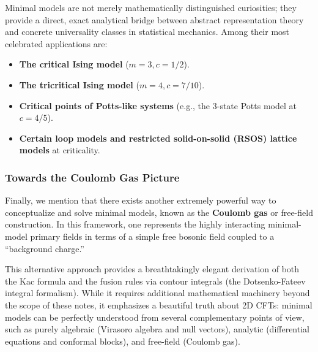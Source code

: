 Minimal models are not merely mathematically distinguished curiosities; they provide a direct, exact analytical bridge between abstract representation theory and concrete universality classes in statistical mechanics. Among their most celebrated applications are:
\begin{itemize}
    \item \textbf{The critical Ising model} (\(m=3, c=1/2\)).
    \item \textbf{The tricritical Ising model} (\(m=4, c=7/10\)).
    \item \textbf{Critical points of Potts-like systems} (e.g., the 3-state Potts model at \(c=4/5\)).
    \item \textbf{Certain loop models and restricted solid-on-solid (RSOS) lattice models} at criticality.
\end{itemize}

\subsubsection{Towards the Coulomb Gas Picture}

Finally, we mention that there exists another extremely powerful way to conceptualize and solve minimal models, known as the \textbf{Coulomb gas} or free-field construction. In this framework, one represents the highly interacting minimal-model primary fields in terms of a simple free bosonic field coupled to a ``background charge.''

This alternative approach provides a breathtakingly elegant derivation of both the Kac formula and the fusion rules via contour integrals (the Dotsenko-Fateev integral formalism). While it requires additional mathematical machinery beyond the scope of these notes, it emphasizes a beautiful truth about 2D CFTs: minimal models can be perfectly understood from several complementary points of view, such as purely algebraic (Virasoro algebra and null vectors), analytic (differential equations and conformal blocks), and free-field (Coulomb gas).